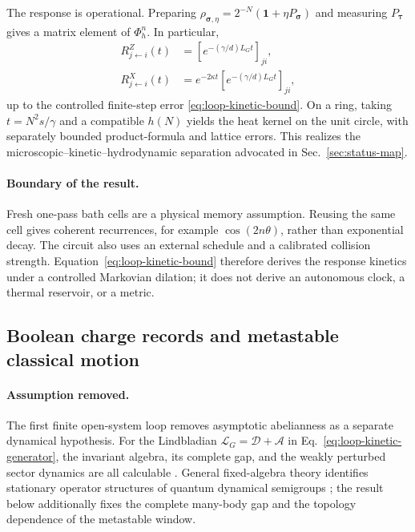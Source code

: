 The response is operational.  Preparing
\(\rho_{\boldsymbol\sigma,\eta}
=2^{-N}(\mathbf1+\eta P_{\boldsymbol\sigma})\) and measuring
\(P_{\boldsymbol\tau}\) gives a matrix element of \(\Phi_h^n\).  In
particular,
\begin{align}
 R^Z_{j\leftarrow i}(t)
 &=\left[e^{-(\gamma/d)L_Gt}\right]_{ji},\nonumber\\
 R^X_{j\leftarrow i}(t)
 &=e^{-2\kappa t}
   \left[e^{-(\gamma/d)L_Gt}\right]_{ji},
 \label{eq:loop-local-response}
\end{align}
up to the controlled finite-step error
\eqref{eq:loop-kinetic-bound}.  On a ring, taking
\(t=N^2s/\gamma\) and a compatible \(h(N)\) yields the heat kernel on the
unit circle, with separately bounded product-formula and lattice errors.
This realizes the microscopic--kinetic--hydrodynamic separation advocated
in Sec.~\ref{sec:status-map}.

\paragraph{Boundary of the result.}
Fresh one-pass bath cells are a physical memory assumption.  Reusing the
same cell gives coherent recurrences, for example \(\cos(2n\theta)\), rather
than exponential decay.  The circuit also uses an external schedule and a
calibrated collision strength.  Equation~\eqref{eq:loop-kinetic-bound}
therefore derives the response kinetics under a controlled Markovian
dilation; it does not derive an autonomous clock, a thermal reservoir, or a
metric.

\subsection{Boolean charge records and metastable classical motion}
\label{sec:loop-boolean}

\paragraph{Assumption removed.}
The first finite open-system loop removes asymptotic abelianness as a
separate dynamical hypothesis.  For the Lindbladian
\(\mathcal L_G=\mathcal D+\mathcal A\) in
Eq.~\eqref{eq:loop-kinetic-generator}, the invariant algebra, its complete
gap, and the weakly perturbed sector dynamics are all calculable
\cite{XuBoolean2026}.  General fixed-algebra theory identifies stationary
operator structures of quantum dynamical semigroups
\cite{Frigerio1978}; the result below additionally fixes the complete
many-body gap and the topology dependence of the metastable window.


